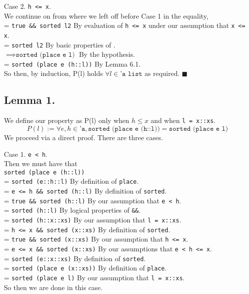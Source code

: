 \documentclass{article}
\begin{document}
\noindent Case 2. \texttt{h <= x}. \\
\indent We continue on from where we left off before Case 1 in the equality, \\
\indent = \texttt{true \&\& sorted l2} \qquad By evaluation of \texttt{h <= x} under our assumption that \texttt{x <= x}. \\
\indent = \texttt{sorted l2} \qquad By basic properties of \text{\&\&}. \\
\indent $\implies \texttt{sorted (place e l)}$ \qquad By the hypothesis. \\
\indent = \texttt{sorted (place e (h::l))} \qquad By Lemma 6.1. \\
\noindent So then, by induction, P(l) holds $\forall l \in \texttt{'a list}$ as
required. $\blacksquare$




\newpage





\subsection{Lemma 1.}
We define our property as P(l) only when $h \leq x$ and when \texttt{l = x::xs}.
\[ P(l) := \forall e,h \in \texttt{'a}, \texttt{sorted (place e (h::l))} = \texttt{sorted (place e l)} \]
We proceed via a direct proof. There are three cases.

\bigskip

\noindent Case 1. \texttt{e < h}.\\
\noindent Then we must have that \\
\indent \texttt{sorted (place e (h::l))} \\
\indent = \texttt{sorted (e::h::l)} \qquad By definition of \texttt{place}. \\
\indent = \texttt{e <= h \&\& sorted (h::l)} \qquad By definition of \texttt{sorted}. \\
\indent = \texttt{true \&\& sorted (h::l)} \qquad By our assumption that \texttt{e < h}. \\
\indent = \texttt{sorted (h::l)} \qquad By logical properties of \texttt{\&\&}. \\
\indent = \texttt{sorted (h::x::xs)} \qquad By our assumption that \texttt{l = x::xs}. \\
\indent = \texttt{h <= x \&\& sorted (x::xs)} \qquad By definition of \texttt{sorted}. \\
\indent = \texttt{true \&\& sorted (x::xs)} \qquad By our assumption that \texttt{h <= x}. \\
\indent = \texttt{e <= x \&\& sorted (x::xs)} \qquad By our assumptions that \texttt{e < h <= x}. \\
\indent = \texttt{sorted (e::x::xs)} \qquad By definition of \texttt{sorted}. \\
\indent = \texttt{sorted (place e (x::xs))} \qquad By definition of \texttt{place}. \\
\indent = \texttt{sorted (place e l)} \qquad By our assumption that \texttt{l = x::xs}. \\
\noindent So then we are done in this case.
\end{document}

